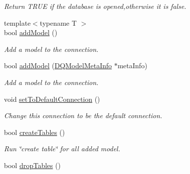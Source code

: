 \begin{DoxyCompactItemize}
\begin{DoxyCompactList}\small\item\em Return TRUE if the database is opened,otherwise it is false. \item\end{DoxyCompactList}\item 
{\footnotesize template$<$typename T $>$ }\\bool \hyperlink{classDQConnection_a8f906b965a9fc69f898bb4a78ec9724c}{addModel} ()
\begin{DoxyCompactList}\small\item\em Add a model to the connection. \item\end{DoxyCompactList}\item 
\hypertarget{classDQConnection_a90471721101d30cfd35b2183d005ddcd}{
bool \hyperlink{classDQConnection_a90471721101d30cfd35b2183d005ddcd}{addModel} (\hyperlink{classDQModelMetaInfo}{DQModelMetaInfo} $\ast$metaInfo)}
\label{classDQConnection_a90471721101d30cfd35b2183d005ddcd}

\begin{DoxyCompactList}\small\item\em Add a model to the connection. \item\end{DoxyCompactList}\item 
\hypertarget{classDQConnection_a412eef8376c920d1e3f694e16617f9c0}{
void \hyperlink{classDQConnection_a412eef8376c920d1e3f694e16617f9c0}{setToDefaultConnection} ()}
\label{classDQConnection_a412eef8376c920d1e3f694e16617f9c0}

\begin{DoxyCompactList}\small\item\em Change this connection to be the default connection. \item\end{DoxyCompactList}\item 
bool \hyperlink{classDQConnection_a04d8bfa08e2f5e7c53961393215a4c96}{createTables} ()
\begin{DoxyCompactList}\small\item\em Run \char`\"{}create table\char`\"{} for all added model. \item\end{DoxyCompactList}\item 
\hypertarget{classDQConnection_a9bfe013a3ff6ac49b3e2db8aa2361282}{
bool \hyperlink{classDQConnection_a9bfe013a3ff6ac49b3e2db8aa2361282}{dropTables} ()}
\label{classDQConnection_a9bfe013a3ff6ac49b3e2db8aa2361282}


\end{DoxyCompactItemize}

